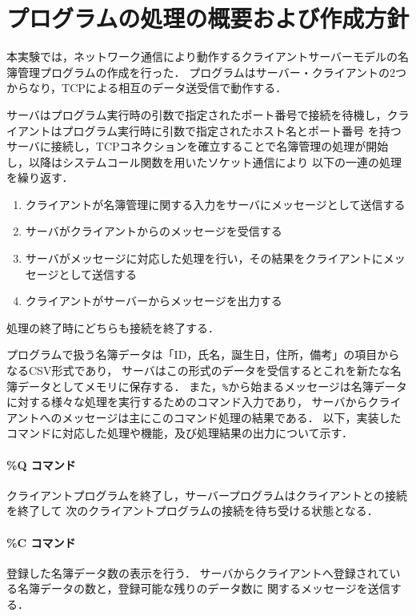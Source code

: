 

\section{プログラムの処理の概要および作成方針}
本実験では，ネットワーク通信により動作するクライアントサーバーモデルの名簿管理プログラムの作成を行った．
プログラムはサーバー・クライアントの2つからなり，TCPによる相互のデータ送受信で動作する．

サーバはプログラム実行時の引数で指定されたポート番号で接続を待機し，クライアントはプログラム実行時に引数で指定されたホスト名とポート番号
を持つサーバに接続し，TCPコネクションを確立することで名簿管理の処理が開始し，以降はシステムコール関数を用いたソケット通信により
以下の一連の処理を繰り返す．
\begin{enumerate}
  \item クライアントが名簿管理に関する入力をサーバにメッセージとして送信する
  \item サーバがクライアントからのメッセージを受信する
  \item サーバがメッセージに対応した処理を行い，その結果をクライアントにメッセージとして送信する
  \item クライアントがサーバーからメッセージを出力する
\end{enumerate}
処理の終了時にどちらも接続を終了する．

プログラムで扱う名簿データは「ID，氏名，誕生日，住所，備考」の項目からなるCSV形式であり，
サーバはこの形式のデータを受信するとこれを新たな名簿データとしてメモリに保存する．
また，\verb|%|から始まるメッセージは名簿データに対する様々な処理を実行するためのコマンド入力であり，
サーバからクライアントへのメッセージは主にこのコマンド処理の結果である．
以下，実装したコマンドに対応した処理や機能，及び処理結果の出力について示す．

\paragraph*{\%Q コマンド}
クライアントプログラムを終了し，サーバープログラムはクライアントとの接続を終了して
次のクライアントプログラムの接続を待ち受ける状態となる．

\paragraph*{\%C コマンド}
登録した名簿データ数の表示を行う．
サーバからクライアントへ登録されている名簿データの数と，登録可能な残りのデータ数に
関するメッセージを送信する．

